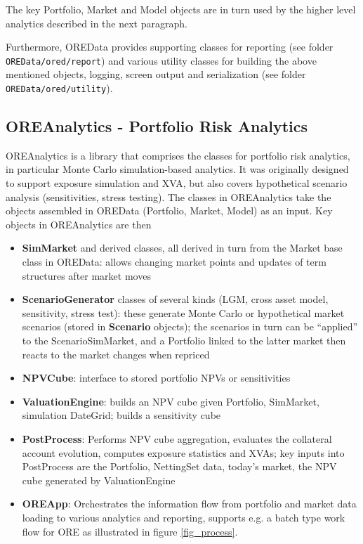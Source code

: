 \documentclass[12pt, a4paper]{article}
\begin{document}
The key Portfolio, Market and Model objects are in turn used by the higher level analytics described in the next paragraph.

Furthermore, OREData provides supporting classes for reporting (see folder {\tt OREData/ored/report}) and various utility classes for building the above mentioned objects, logging, screen output and serialization (see folder {\tt OREData/ored/utility}).

\subsection*{OREAnalytics - Portfolio Risk Analytics}

OREAnalytics is a library that comprises the classes for portfolio risk analytics, in particular Monte Carlo simulation-based analytics. It was originally designed to support exposure simulation and XVA, but also covers hypothetical scenario analysis
(sensitivities, stress testing). The classes in OREAnalytics take the objects assembled in OREData (Portfolio, Market, Model) as an input. Key objects in OREAnalytics are then
\begin{itemize}
\item {\bf SimMarket} and derived classes, all derived in turn from the Market base class in OREData: allows changing market points and updates of term structures after market moves
\item {\bf ScenarioGenerator} classes of several kinds (LGM, cross asset model, sensitivity, stress test): these generate Monte Carlo or hypothetical market scenarios (stored in {\bf Scenario} objects);
the scenarios in turn can be ``applied'' to the ScenarioSimMarket, and a Portfolio linked to the latter market then reacts to the market changes when repriced
\item {\bf NPVCube}: interface to stored portfolio NPVs or sensitivities
\item {\bf ValuationEngine}: builds an NPV cube given Portfolio, SimMarket, simulation DateGrid; builds a sensitivity cube
\item {\bf PostProcess}: Performs NPV cube aggregation, evaluates the collateral account evolution, computes exposure statistics and XVAs; key inputs into PostProcess are the Portfolio, NettingSet data, today's market, the NPV cube generated by ValuationEngine
\item {\bf OREApp}: Orchestrates the information flow from portfolio and market data loading to various analytics and reporting, supports e.g. a batch type work flow for ORE as illustrated in figure \ref{fig_process}.
\end{itemize}
\end{document}

